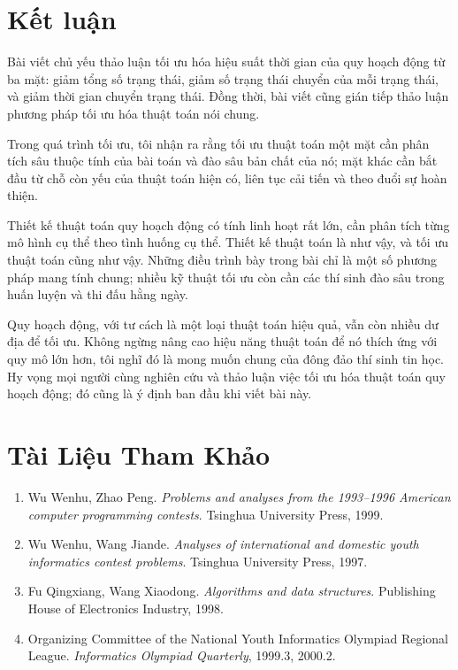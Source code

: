 \documentclass[11pt]{article}
\begin{document}
\section{Kết luận}

Bài viết chủ yếu thảo luận tối ưu hóa hiệu suất thời gian của quy hoạch động
từ ba mặt: giảm tổng số trạng thái, giảm số trạng thái chuyển của mỗi trạng
thái, và giảm thời gian chuyển trạng thái. Đồng thời, bài viết cũng gián tiếp
thảo luận phương pháp tối ưu hóa thuật toán nói chung.

Trong quá trình tối ưu, tôi nhận ra rằng tối ưu thuật toán một mặt cần phân
tích sâu thuộc tính của bài toán và đào sâu bản chất của nó; mặt khác cần bắt
đầu từ chỗ còn yếu của thuật toán hiện có, liên tục cải tiến và theo đuổi sự
hoàn thiện.

Thiết kế thuật toán quy hoạch động có tính linh hoạt rất lớn, cần phân tích
từng mô hình cụ thể theo tình huống cụ thể. Thiết kế thuật toán là như vậy,
và tối ưu thuật toán cũng như vậy. Những điều trình bày trong bài chỉ là một
số phương pháp mang tính chung; nhiều kỹ thuật tối ưu còn cần các thí sinh đào
sâu trong huấn luyện và thi đấu hằng ngày.

Quy hoạch động, với tư cách là một loại thuật toán hiệu quả, vẫn còn nhiều
dư địa để tối ưu. Không ngừng nâng cao hiệu năng thuật toán để nó thích ứng
với quy mô lớn hơn, tôi nghĩ đó là mong muốn chung của đông đảo thí sinh tin
học. Hy vọng mọi người cùng nghiên cứu và thảo luận việc tối ưu hóa thuật
toán quy hoạch động; đó cũng là ý định ban đầu khi viết bài này.

\section*{Tài Liệu Tham Khảo}

\begin{enumerate}
  \item Wu Wenhu, Zhao Peng. \textit{Problems and analyses from the 1993--1996
  American computer programming contests}. Tsinghua University Press, 1999.
  \item Wu Wenhu, Wang Jiande. \textit{Analyses of international and domestic
  youth informatics contest problems}. Tsinghua University Press, 1997.
  \item Fu Qingxiang, Wang Xiaodong. \textit{Algorithms and data structures}.
  Publishing House of Electronics Industry, 1998.
  \item Organizing Committee of the National Youth Informatics Olympiad
  Regional League. \textit{Informatics Olympiad Quarterly}, 1999.3, 2000.2.
\end{enumerate}
\end{document}
